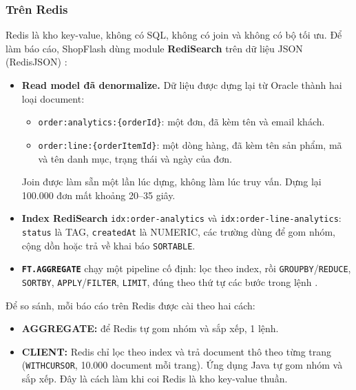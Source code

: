 \subsubsection{Trên Redis}\label{sec:q-redis}

Redis là kho key-value, không có SQL, không có join và không có bộ tối ưu. Để làm báo cáo, ShopFlash dùng module \textbf{RediSearch} trên dữ liệu JSON (RedisJSON) \cite{q-redis-aggregations}:
\begin{itemize}
  \item \textbf{Read model đã denormalize.} Dữ liệu được dựng lại từ Oracle thành hai loại document:
  \begin{itemize}
    \item \texttt{order:analytics:\{orderId\}}: một đơn, đã kèm tên và email khách.
    \item \texttt{order:line:\{orderItemId\}}: một dòng hàng, đã kèm tên sản phẩm, mã và tên danh mục, trạng thái và ngày của đơn.
  \end{itemize}
  Join được làm sẵn một lần lúc dựng, không làm lúc truy vấn. Dựng lại 100.000 đơn mất khoảng 20--35 giây.
  \item \textbf{Index RediSearch} \texttt{idx:order-analytics} và \texttt{idx:order-line-analytics}: \texttt{status} là TAG, \texttt{createdAt} là NUMERIC, các trường dùng để gom nhóm, cộng dồn hoặc trả về khai báo \texttt{SORTABLE}.
  \item \textbf{\texttt{FT.AGGREGATE}} chạy một pipeline cố định: lọc theo index, rồi \texttt{GROUPBY}/\texttt{REDUCE}, \texttt{SORTBY}, \texttt{APPLY}/\texttt{FILTER}, \texttt{LIMIT}, đúng theo thứ tự các bước trong lệnh \cite{q-redis-commands}.
\end{itemize}

Để so sánh, mỗi báo cáo trên Redis được cài theo hai cách:
\begin{itemize}
  \item \textbf{AGGREGATE:} để Redis tự gom nhóm và sắp xếp, 1 lệnh.
  \item \textbf{CLIENT:} Redis chỉ lọc theo index và trả document thô theo từng trang (\texttt{WITHCURSOR}, 10.000 document mỗi trang). Ứng dụng Java tự gom nhóm và sắp xếp. Đây là cách làm khi coi Redis là kho key-value thuần.
\end{itemize}

